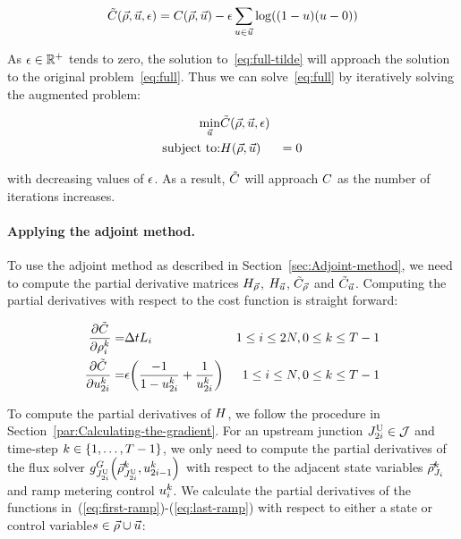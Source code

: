 \begin{equation}
\tilde{\cost}\left(\state,\control,\epsilon\right)=\cost\left(\state,\control\right)-\barrierTerm\sum_{\convar\in\control}\log\left(\left(1-\convar\right)\left(\convar-0\right)\right)\label{eq:full-tilde}
\end{equation}


As $\epsilon\in\mathbb{R}^{+}$ tends to zero, the solution to~\eqref{eq:full-tilde}
will approach the solution to the original problem~\eqref{eq:full}.
Thus we can solve~\eqref{eq:full} by iteratively solving the augmented
problem:

\begin{eqnarray}
\min_{\control} & \tilde{\cost}\left(\state,\control,\epsilon\right)\label{eq:full-1}\\
\text{subject to:} & \sys\left(\state,\control\right) & =0\nonumber 
\end{eqnarray}


with decreasing values of $\epsilon$. As a result, $\tilde{C}$
will approach $C$ as the number of iterations increases.


\paragraph{Applying the adjoint method.}

To use the adjoint method as described in Section~\ref{sec:Adjoint-method},
we need to compute the partial derivative matrices $H_{\vec{\rho}}$, $H_{\vec{u}}$,
$\tilde{C}_{\vec{\rho}}$ and $\tilde{C}_{\vec{u}}$. Computing the partial
derivatives with respect to the cost function is straight forward:

\begin{eqnarray*}
\pfrac{\tilde{\cost}}{\discrete{\link}{\tind}}= & \Delta tL_{i} & 1\le i\le2\nlinks,0\le k\le T-1\\
\pfrac{\tilde{\cost}}{\ramp_{2\link}^{\tind}}= & \barrierTerm\left(\frac{-1}{1-\ramp_{2\link}^{\tind}}+\frac{1}{\ramp_{2\link}^{\tind}}\right) & 1\le i\le\nlinks,0\le k\le T-1
\end{eqnarray*}


To compute the partial derivatives of $H$, we follow the procedure
in Section~\ref{par:Calculating-the-gradient}. For an upstream junction
$J_{2i}^{\text{U}}\in\mathcal{J}$ and time-step $k\in\intrange 1{\ntime-1}$,
we only need to compute the partial derivatives of the flux solver
$\god_{\jup{2\link}}\left(\juncstate{\jup{2\link}}{\tind},\ramp_{2\link-1}^{\tind}\right)_{\text{}}$
with respect to the adjacent state variables $\vec{\rho}_{J_{i}}^{k}$
and ramp metering control $u_{i}^{k}$. We calculate the
partial derivatives of the functions in~(\eqref{eq:first-ramp})-(\eqref{eq:last-ramp})
with respect to either a state or control variable$s\in\vec{\rho}\cup\vec{u}$:

